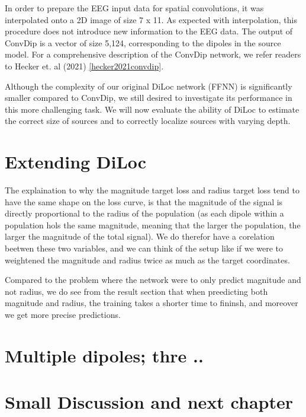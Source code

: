 \documentclass[a4paper, UKenglish, 11pt]{uiomaster}
\begin{document}
In order to prepare the EEG input data for spatial convolutions, it was interpolated onto a 2D image of size 7 x 11. As expected with interpolation, this procedure does not introduce new information to the EEG data. The output of ConvDip is a vector of size 5,124, corresponding to the dipoles in the source model. For a comprehensive description of the ConvDip network, we refer readers to Hecker et. al (2021) \ref{hecker2021convdip}.

Although the complexity of our original DiLoc network (FFNN) is significantly smaller compared to ConvDip, we still desired to investigate its performance in this more challenging task. We will now evaluate the ability of DiLoc to estimate the correct size of sources and to correctly localize sources with varying depth.

\section{Extending DiLoc}
The explaination to why the magnitude target loss and radius target loss tend to have the same shape on the loss curve, is that the magnitude of the signal is directly proportional to the radius of the population (as each dipole within a population hols the same magnitude, meaning that the larger the population, the larger the magnitude of the total signal). We do therefor have a corelation beetwen these two variables, and we can think of the setup like if we were to weightened the magnitude and radius twice as much as the target coordinates.

Compared to the problem where the network were to only predict magnitude and not radius, we do see from the result section that when preedicting both magnitude and radius, the training takes a shorter time to fininsh, and moreover we get more precise predictions.

\section{Multiple dipoles; thre .. }

\section{Small Discussion and next chapter}
\end{document}
